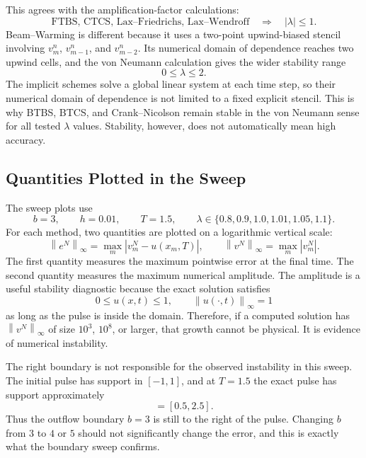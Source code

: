 \documentclass[11pt]{article}
\newcommand{\norm}[1]{\left\lVert #1\right\rVert}
\begin{document}
This agrees with the amplification-factor calculations:
\begin{equation}
    \text{FTBS, CTCS, Lax--Friedrichs, Lax--Wendroff}
    \quad\Longrightarrow\quad
    |\lambda|\le 1.
\end{equation}
Beam--Warming is different because it uses a two-point upwind-biased stencil
involving $v_m^n$, $v_{m-1}^n$, and $v_{m-2}^n$.  Its numerical domain of dependence
reaches two upwind cells, and the von Neumann calculation gives the wider stability
range
\begin{equation}
    0\le \lambda\le 2.
\end{equation}
The implicit schemes solve a global linear system at each time step, so their
numerical domain of dependence is not limited to a fixed explicit stencil.  This is
why BTBS, BTCS, and Crank--Nicolson remain stable in the von Neumann sense for all
tested $\lambda$ values.  Stability, however, does not automatically mean high
accuracy.

\subsection{Quantities Plotted in the Sweep}

The sweep plots use
\begin{equation}
    b=3,\qquad h=0.01,\qquad T=1.5,
    \qquad
    \lambda\in\{0.8,0.9,1.0,1.01,1.05,1.1\}.
\end{equation}
For each method, two quantities are plotted on a logarithmic vertical scale:
\begin{equation}
    \norm{e^N}_\infty
    =
    \max_m |v_m^N-u(x_m,T)|,
    \qquad
    \norm{v^N}_\infty
    =
    \max_m |v_m^N|.
\end{equation}
The first quantity measures the maximum pointwise error at the final time.  The
second quantity measures the maximum numerical amplitude.  The amplitude is a useful
stability diagnostic because the exact solution satisfies
\begin{equation}
    0\le u(x,t)\le 1,
    \qquad
    \norm{u(\cdot,t)}_\infty=1
\end{equation}
as long as the pulse is inside the domain.  Therefore, if a computed solution has
$\norm{v^N}_\infty$ of size $10^3$, $10^8$, or larger, that growth cannot be physical.
It is evidence of numerical instability.

The right boundary is not responsible for the observed instability in this sweep.
The initial pulse has support in $[-1,1]$, and at $T=1.5$ the exact pulse has support
approximately
\begin{equation}
    [-1+1.5,\,1+1.5]=[0.5,2.5].
\end{equation}
Thus the outflow boundary $b=3$ is still to the right of the pulse.  Changing
$b$ from $3$ to $4$ or $5$ should not significantly change the error, and this is
exactly what the boundary sweep confirms.
\end{document}
